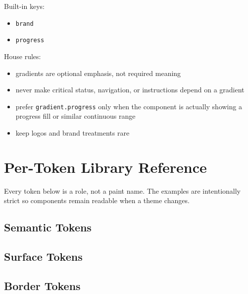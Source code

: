 Built-in keys:

\begin{itemize}
\tightlist
\item
  \texttt{b\allowbreak{}r\allowbreak{}a\allowbreak{}n\allowbreak{}d}
\item
  \texttt{p\allowbreak{}r\allowbreak{}o\allowbreak{}g\allowbreak{}r\allowbreak{}e\allowbreak{}s\allowbreak{}s}
\end{itemize}

House rules:

\begin{itemize}
\tightlist
\item
  gradients are optional emphasis, not required meaning
\item
  never make critical status, navigation, or instructions depend on a gradient
\item
  prefer \texttt{g\allowbreak{}r\allowbreak{}a\allowbreak{}d\allowbreak{}i\allowbreak{}e\allowbreak{}n\allowbreak{}t\allowbreak{}.\allowbreak{}p\allowbreak{}r\allowbreak{}o\allowbreak{}g\allowbreak{}r\allowbreak{}e\allowbreak{}s\allowbreak{}s} only when the component is actually showing a progress fill or similar continuous range
\item
  keep logos and brand treatments rare
\end{itemize}

\section{Per-Token Library Reference}\label{record-028-per-token-library-reference}

Every token below is a role, not a paint name. The examples are intentionally strict so components remain readable when a theme changes.

\subsection{Semantic Tokens}\label{record-028-semantic-tokens}



\subsection{Surface Tokens}\label{record-028-surface-tokens}



\subsection{Border Tokens}\label{record-028-border-tokens}

